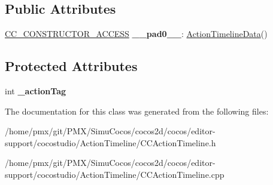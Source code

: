 \subsection*{Public Attributes}
\begin{DoxyCompactItemize}
\item 
\mbox{\label{classActionTimelineData_a9c8e3dff6c554a03a0735565962b4011}} 
\hyperlink{_2cocos2d_2cocos_2base_2ccConfig_8h_a25ef1314f97c35a2ed3d029b0ead6da0}{C\+C\+\_\+\+C\+O\+N\+S\+T\+R\+U\+C\+T\+O\+R\+\_\+\+A\+C\+C\+E\+SS} {\bfseries \+\_\+\+\_\+pad0\+\_\+\+\_\+}\+: \hyperlink{classActionTimelineData}{Action\+Timeline\+Data}()
\end{DoxyCompactItemize}
\subsection*{Protected Attributes}
\begin{DoxyCompactItemize}
\item 
\mbox{\label{classActionTimelineData_a2b7b57e472972e05c3c34191c2afe753}} 
int {\bfseries \+\_\+action\+Tag}
\end{DoxyCompactItemize}


The documentation for this class was generated from the following files\+:\begin{DoxyCompactItemize}
\item 
/home/pmx/git/\+P\+M\+X/\+Simu\+Cocos/cocos2d/cocos/editor-\/support/cocostudio/\+Action\+Timeline/C\+C\+Action\+Timeline.\+h\item 
/home/pmx/git/\+P\+M\+X/\+Simu\+Cocos/cocos2d/cocos/editor-\/support/cocostudio/\+Action\+Timeline/C\+C\+Action\+Timeline.\+cpp\end{DoxyCompactItemize}
